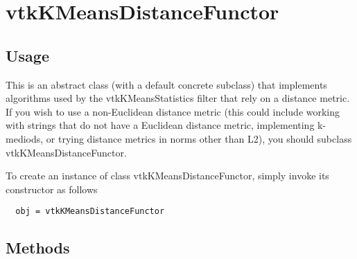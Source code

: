 \section{vtkKMeansDistanceFunctor}

\subsection{Usage}

 This is an abstract class (with a default concrete subclass) that implements
 algorithms used by the vtkKMeansStatistics filter that rely on a distance metric.
 If you wish to use a non-Euclidean distance metric (this could include
 working with strings that do not have a Euclidean distance metric, implementing
 k-mediods, or trying distance metrics in norms other than L2), you
 should subclass vtkKMeansDistanceFunctor.

To create an instance of class vtkKMeansDistanceFunctor, simply
invoke its constructor as follows
\begin{verbatim}
  obj = vtkKMeansDistanceFunctor
\end{verbatim}
\subsection{Methods}


